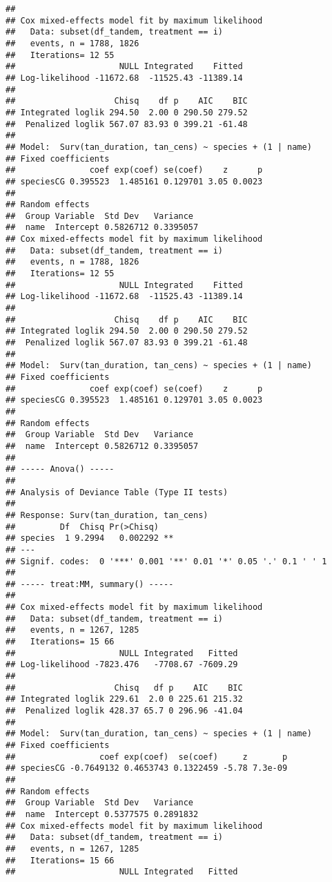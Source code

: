 \documentclass[
]{article}
\begin{document}
\begin{verbatim}
## 
## Cox mixed-effects model fit by maximum likelihood
##   Data: subset(df_tandem, treatment == i)
##   events, n = 1788, 1826
##   Iterations= 12 55 
##                     NULL Integrated    Fitted
## Log-likelihood -11672.68  -11525.43 -11389.14
## 
##                    Chisq    df p    AIC    BIC
## Integrated loglik 294.50  2.00 0 290.50 279.52
##  Penalized loglik 567.07 83.93 0 399.21 -61.48
## 
## Model:  Surv(tan_duration, tan_cens) ~ species + (1 | name) 
## Fixed coefficients
##               coef exp(coef) se(coef)    z      p
## speciesCG 0.395523  1.485161 0.129701 3.05 0.0023
## 
## Random effects
##  Group Variable  Std Dev   Variance 
##  name  Intercept 0.5826712 0.3395057
## Cox mixed-effects model fit by maximum likelihood
##   Data: subset(df_tandem, treatment == i)
##   events, n = 1788, 1826
##   Iterations= 12 55 
##                     NULL Integrated    Fitted
## Log-likelihood -11672.68  -11525.43 -11389.14
## 
##                    Chisq    df p    AIC    BIC
## Integrated loglik 294.50  2.00 0 290.50 279.52
##  Penalized loglik 567.07 83.93 0 399.21 -61.48
## 
## Model:  Surv(tan_duration, tan_cens) ~ species + (1 | name) 
## Fixed coefficients
##               coef exp(coef) se(coef)    z      p
## speciesCG 0.395523  1.485161 0.129701 3.05 0.0023
## 
## Random effects
##  Group Variable  Std Dev   Variance 
##  name  Intercept 0.5826712 0.3395057
## 
## ----- Anova() -----
## 
## Analysis of Deviance Table (Type II tests)
## 
## Response: Surv(tan_duration, tan_cens)
##         Df  Chisq Pr(>Chisq)   
## species  1 9.2994   0.002292 **
## ---
## Signif. codes:  0 '***' 0.001 '**' 0.01 '*' 0.05 '.' 0.1 ' ' 1
## 
## ----- treat:MM, summary() -----
## 
## Cox mixed-effects model fit by maximum likelihood
##   Data: subset(df_tandem, treatment == i)
##   events, n = 1267, 1285
##   Iterations= 15 66 
##                     NULL Integrated   Fitted
## Log-likelihood -7823.476   -7708.67 -7609.29
## 
##                    Chisq   df p    AIC    BIC
## Integrated loglik 229.61  2.0 0 225.61 215.32
##  Penalized loglik 428.37 65.7 0 296.96 -41.04
## 
## Model:  Surv(tan_duration, tan_cens) ~ species + (1 | name) 
## Fixed coefficients
##                 coef exp(coef)  se(coef)     z       p
## speciesCG -0.7649132 0.4653743 0.1322459 -5.78 7.3e-09
## 
## Random effects
##  Group Variable  Std Dev   Variance 
##  name  Intercept 0.5377575 0.2891832
## Cox mixed-effects model fit by maximum likelihood
##   Data: subset(df_tandem, treatment == i)
##   events, n = 1267, 1285
##   Iterations= 15 66 
##                     NULL Integrated   Fitted

\end{verbatim}
\end{document}
